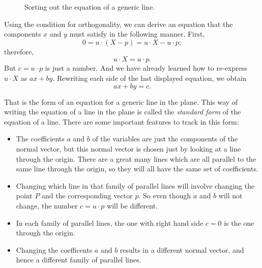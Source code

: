 \documentclass[00-livre-main.tex]{subfiles}
\begin{document}
\begin{figure}[h]
\centering
{}
\caption{Sorting out the equation of a generic line.}
\label{fig:general-line}
\end{figure}


Using the condition for orthogonality, we can derive an equation that the components $x$ and $y$ must satisfy in the following manner. First,
\[
0 = u\cdot (X-p) = u\cdot X - u\cdot p;
\]
therefore,
\[
u\cdot X = u\cdot p.
\]
But $c =u\cdot p$ is just a number. And we have already learned how to re-express $u\cdot X$ as $ax+by$. Rewriting each side of the last displayed equation, we obtain
\[
ax +by = c.
\]

That is the form of an equation for a generic line in the plane. This way of writing the equation of a line in the plane is called the \emph{standard form} of the equation of a line. There are some important features to track in this form:
\begin{itemize}
\item The coefficients $a$ and $b$ of the variables are just the components of the normal vector, but this normal vector is chosen just by looking at a line through the origin. There are a great many lines which are all parallel to the same line through the origin, so they will all have the same set of coefficients.
\item Changing which line in that family of parallel lines will involve changing the point $P$ and the corresponding vector $p$. So even though $a$ and $b$ will not change, the number $c = u\cdot p$ will be different.
\item In each family of parallel lines, the one with right hand side $c=0$ is the one through the origin.
\item Changing the coefficents $a$ and $b$ results in a different normal vector, and hence a different family of parallel lines.
\end{itemize}
\end{document}
